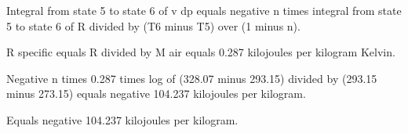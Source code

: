 Integral from state 5 to state 6 of v dp equals negative n times integral from state 5 to state 6 of R divided by (T6 minus T5) over (1 minus n).  

R specific equals R divided by M air equals 0.287 kilojoules per kilogram Kelvin.  

Negative n times 0.287 times log of (328.07 minus 293.15) divided by (293.15 minus 273.15) equals negative 104.237 kilojoules per kilogram.  

Equals negative 104.237 kilojoules per kilogram.